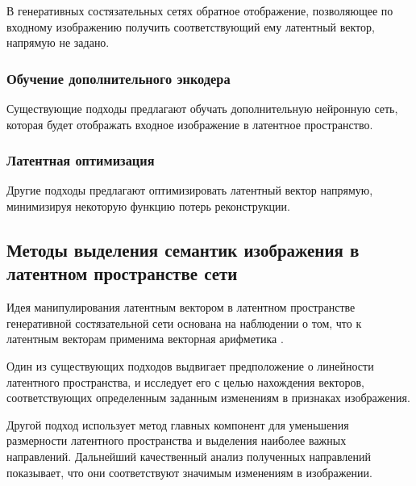 В генеративных состязательных сетях обратное отображение, позволяющее по входному изображению получить соответствующий ему латентный вектор, напрямую не задано.

\subsubsection{Обучение дополнительного энкодера}


Существующие подходы \cite{donahue2016adversarial} предлагают обучать дополнительную нейронную сеть, которая будет отображать входное изображение в латентное пространство.

\subsubsection{Латентная оптимизация}


Другие подходы \cite{perarnau2016invertible} предлагают оптимизировать латентный вектор напрямую, минимизируя некоторую функцию потерь реконструкции.

\subsection{Методы выделения семантик изображения в латентном пространстве сети}
Идея манипулирования латентным вектором в латентном пространстве генеративной состязательной сети основана на наблюдении о том, что к латентным векторам применима векторная арифметика \cite{radford2015unsupervised}.

Один из существующих подходов \cite{shen2020interfacegan} выдвигает предположение о линейности латентного пространства, и исследует его с целью нахождения векторов, соответствующих определенным заданным изменениям в признаках изображения.

Другой подход \cite{hrknen2020ganspace} использует метод главных компонент для уменьшения размерности латентного пространства и выделения наиболее важных направлений. Дальнейший качественный анализ полученных направлений показывает, что они соответствуют значимым изменениям в изображении.
